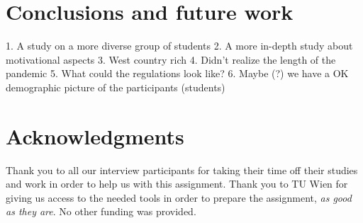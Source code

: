 \documentclass{sigchi}
\begin{document}
\section{Conclusions and future work}

1. A study on a more diverse group of students
2. A more in-depth study about motivational aspects
3. West country rich 
4. Didn’t realize the length of the pandemic
5. What could the regulations look like?
6. Maybe (?) we have a OK demographic picture of the participants (students) \\





\section{Acknowledgments}
Thank you to all our interview participants for taking their time off their studies and work in order to help us with this assignment. Thank you to TU Wien for giving us access to the needed tools in order to prepare the assignment,  \textit{as good as they are}. No other funding was provided.



\end{document}
